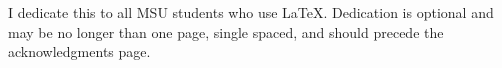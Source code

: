 
I dedicate this to all MSU students who use \LaTeX.  Dedication is optional and may be no longer than one page, single spaced, and should precede the acknowledgments page.  



